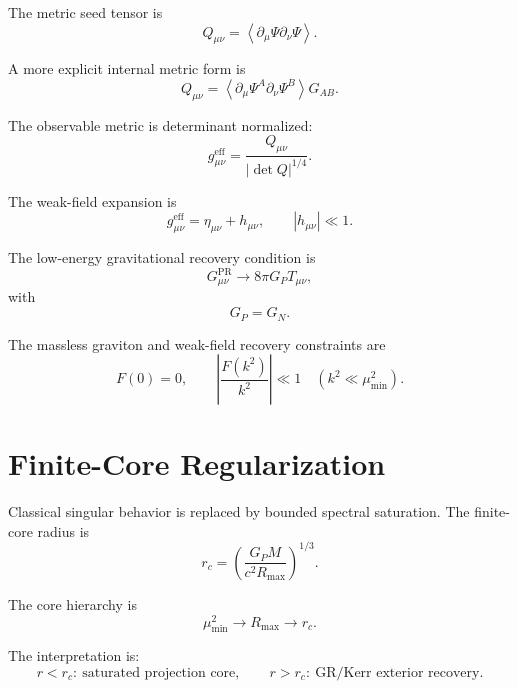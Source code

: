 \documentclass[11pt]{article}
\newcommand{\PR}{\mathrm{PR}}
\newcommand{\eff}{\mathrm{eff}}
\begin{document}
The metric seed tensor is
\begin{equation}
Q_{\mu\nu}
=
\left\langle
\partial_\mu\Psi
\partial_\nu\Psi
\right\rangle.
\end{equation}

A more explicit internal metric form is
\begin{equation}
Q_{\mu\nu}
=
\left\langle
\partial_\mu\Psi^A
\partial_\nu\Psi^B
\right\rangle
G_{AB}.
\end{equation}

The observable metric is determinant normalized:
\begin{equation}
\boxed{
g_{\mu\nu}^{\eff}
=
\frac{Q_{\mu\nu}}{|\det Q|^{1/4}}.
}
\end{equation}

The weak-field expansion is
\begin{equation}
g_{\mu\nu}^{\eff}
=
\eta_{\mu\nu}+h_{\mu\nu},
\qquad
|h_{\mu\nu}|\ll1.
\end{equation}

The low-energy gravitational recovery condition is
\begin{equation}
G_{\mu\nu}^{\PR}
\rightarrow
8\pi G_PT_{\mu\nu},
\end{equation}
with
\begin{equation}
\boxed{
G_P=G_N.
}
\end{equation}

The massless graviton and weak-field recovery constraints are
\begin{equation}
\boxed{
F(0)=0,
\qquad
\left|
\frac{F(k^2)}{k^2}
\right|
\ll1
\quad
(k^2\ll\mu_{\min}^2).
}
\end{equation}

\section{Finite-Core Regularization}

Classical singular behavior is replaced by bounded spectral saturation. The finite-core radius is
\begin{equation}
\boxed{
r_c
=
\left(
\frac{G_PM}{c^2R_{\max}}
\right)^{1/3}.
}
\end{equation}

The core hierarchy is
\begin{equation}
\mu_{\min}^2
\rightarrow
R_{\max}
\rightarrow
r_c.
\end{equation}

The interpretation is:
\[
r<r_c:\ \text{saturated projection core},
\qquad
r>r_c:\ \text{GR/Kerr exterior recovery}.
\]
\end{document}
